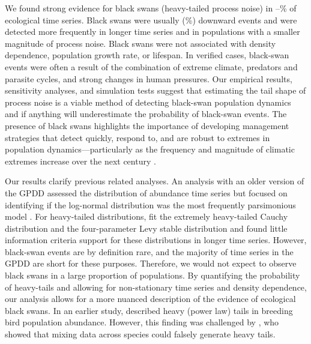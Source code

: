 We found strong evidence for black swans (heavy-tailed process noise) in
\overallMinPerc--\overallMaxPerc\% of ecological time series. Black swans were
usually (\percBSDown \%) downward events and were detected more frequently in
longer time series and in populations with a smaller magnitude of process
noise. Black swans were not associated with density dependence, population
growth rate, or lifespan. In verified cases, black-swan events were often a
result of the combination of extreme climate, predators and parasite cycles,
and strong changes in human pressures. Our empirical results, sensitivity
analyses, and simulation tests suggest that estimating the tail shape of
process noise is a viable method of detecting black-swan population dynamics
and if anything will underestimate the probability of black-swan events. The
presence of black swans highlights the importance of developing management
strategies that detect quickly, respond to, and are robust to extremes in
population dynamics---particularly as the frequency and magnitude of climatic
extremes increase over the next century \citep{easterling2000,ipcc2012}.

Our results clarify previous related analyses. An analysis with an older
version of the GPDD assessed the distribution of abundance time series but
focused on identifying if the log-normal distribution was the most frequently
parsimonious model \citep{halley2002}. For heavy-tailed distributions,
\citet{halley2002} fit the extremely heavy-tailed Cauchy distribution and the
four-parameter Levy stable distribution and found little information criteria
support for these distributions in longer time series. However, black-swan
events are by definition rare, and the majority of time series in the GPDD are
short for these purposes. Therefore, we would not expect to observe black
swans in a large proportion of populations. By quantifying the probability of
heavy-tails and allowing for non-stationary time series and density
dependence, our analysis allows for a more nuanced description of the evidence
of ecological black swans. In an earlier study, \citet{keitt1998} described
heavy (power law) tails in breeding bird population abundance. However, this
finding was challenged by \citet{allen2001}, who showed that mixing data
across species could falsely generate heavy tails.

